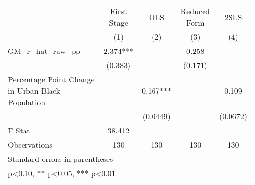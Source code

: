 {
\def\sym#1{\ifmmode^{#1}\else\(^{#1}\)\fi}
\begin{tabular}{l*{4}{c}}
\toprule
                    & First Stage   &         OLS   &Reduced Form   &        2SLS   \\
                    &\multicolumn{1}{c}{(1)}   &\multicolumn{1}{c}{(2)}   &\multicolumn{1}{c}{(3)}   &\multicolumn{1}{c}{(4)}   \\
\midrule
GM\_r\_hat\_raw\_pp     &       2.374***&               &       0.258   &               \\
                    &     (0.383)   &               &     (0.171)   &               \\
\addlinespace
Percentage Point Change in Urban Black Population&               &       0.167***&               &       0.109   \\
                    &               &    (0.0449)   &               &    (0.0672)   \\
\midrule
F-Stat              &      38.412   &               &               &               \\
Observations        &         130   &         130   &         130   &         130   \\
\bottomrule
\multicolumn{5}{l}{\footnotesize Standard errors in parentheses}\\
\multicolumn{5}{l}{\footnotesize * p<0.10, ** p<0.05, *** p<0.01}\\
\end{tabular}
}
